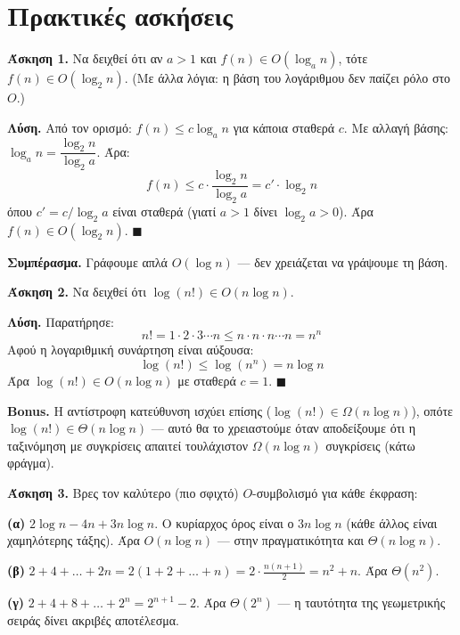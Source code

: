 \documentclass[11pt,a4paper]{article}
\begin{document}
\section{Πρακτικές ασκήσεις}

\begin{examplebox}
\textbf{Άσκηση 1.} Να δειχθεί ότι αν $a > 1$ και $f(n) \in O(\log_a n)$, τότε
$f(n) \in O(\log_2 n)$. (Με άλλα λόγια: η βάση του λογάριθμου δεν παίζει ρόλο στο
$O$.)

\textbf{Λύση.} Από τον ορισμό: $f(n) \le c \log_a n$ για κάποια σταθερά $c$. Με
αλλαγή βάσης: $\log_a n = \dfrac{\log_2 n}{\log_2 a}$. Άρα:
\[
f(n) \le c \cdot \frac{\log_2 n}{\log_2 a} = c' \cdot \log_2 n
\]
όπου $c' = c / \log_2 a$ είναι σταθερά (γιατί $a > 1$ δίνει $\log_2 a > 0$). Άρα
$f(n) \in O(\log_2 n)$. $\blacksquare$

\textbf{Συμπέρασμα.} Γράφουμε απλά $O(\log n)$ --- δεν χρειάζεται να γράψουμε τη
βάση.
\end{examplebox}

\begin{examplebox}
\textbf{Άσκηση 2.} Να δειχθεί ότι $\log(n!) \in O(n \log n)$.

\textbf{Λύση.} Παρατήρησε:
\[
n! = 1 \cdot 2 \cdot 3 \cdots n \le n \cdot n \cdot n \cdots n = n^n
\]
Αφού η λογαριθμική συνάρτηση είναι αύξουσα:
\[
\log(n!) \le \log(n^n) = n \log n
\]
Άρα $\log(n!) \in O(n \log n)$ με σταθερά $c = 1$. $\blacksquare$

\textbf{Bonus.} Η αντίστροφη κατεύθυνση ισχύει επίσης ($\log(n!) \in \Omega(n
\log n)$), οπότε $\log(n!) \in \Theta(n \log n)$ --- αυτό θα το χρειαστούμε όταν
αποδείξουμε ότι η ταξινόμηση με συγκρίσεις απαιτεί τουλάχιστον $\Omega(n \log n)$
συγκρίσεις (κάτω φράγμα).
\end{examplebox}

\begin{examplebox}
\textbf{Άσκηση 3.} Βρες τον καλύτερο (πιο σφιχτό) $O$-συμβολισμό για κάθε
έκφραση:

\textbf{(α)} $2 \log n - 4n + 3n \log n$. Ο κυρίαρχος όρος είναι ο $3n \log n$
(κάθε άλλος είναι χαμηλότερης τάξης). Άρα $O(n \log n)$ --- στην πραγματικότητα
και $\Theta(n \log n)$.

\textbf{(β)} $2 + 4 + \dots + 2n = 2(1 + 2 + \dots + n) = 2 \cdot
\frac{n(n+1)}{2} = n^2 + n$. Άρα $\Theta(n^2)$.

\textbf{(γ)} $2 + 4 + 8 + \dots + 2^n = 2^{n+1} - 2$. Άρα $\Theta(2^n)$ --- η
ταυτότητα της γεωμετρικής σειράς δίνει ακριβές αποτέλεσμα.
\end{examplebox}
\end{document}
